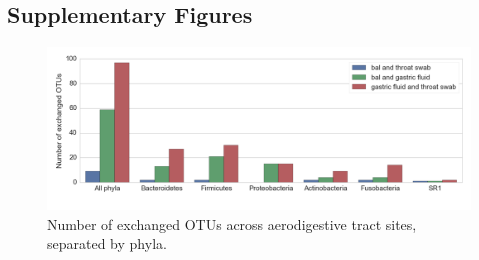 \documentclass[12pt]{article}
\begin{document}
\newpage
\subsection{Supplementary Figures}\label{sec:appendix_figures}

\begin{figure}[h]
\begin{center}
	\includegraphics[scale=0.6]{shared_phyla}
	\caption{Number of exchanged OTUs across aerodigestive tract
	sites, separated by phyla.}
	\label{fig:shared_phyla}
\end{center}
\end{figure}

\newpage

\end{document}
